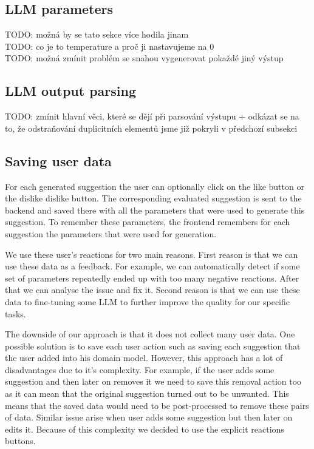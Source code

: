 \subsection{LLM parameters}

TODO: možná by se tato sekce více hodila jinam \\

TODO: co je to temperature a proč ji nastavujeme na 0 \\

TODO: možná zmínit problém se snahou vygenerovat pokaždé jiný výstup \\


\subsection{LLM output parsing}

TODO: zmínit hlavní věci, které se dějí při parsování výstupu + odkázat se na to, že odstraňování duplicitních elementů jsme již pokryli v předchozí subsekci \\


\subsection{Saving user data}

For each generated suggestion the user can optionally click on the like button or the dislike dislike button. The corresponding evaluated suggestion is sent to the backend and saved there with all the parameters that were used to generate this suggestion. To remember these parameters, the frontend remembers for each suggestion the parameters that were used for generation.

We use these user's reactions for two main reasons. First reason is that we can use these data as a feedback. For example, we can automatically detect if some set of parameters repeatedly ended up with too many negative reactions. After that we can analyse the issue and fix it. Second reason is that we can use these data to fine-tuning some LLM to further improve the quality for our specific tasks.

The downside of our approach is that it does not collect many user data. One possible solution is to save each user action such as saving each suggestion that the user added into his domain model. However, this approach has a lot of disadvantages due to it's complexity. For example, if the user adds some suggestion and then later on removes it we need to save this removal action too as it can mean that the original suggestion turned out to be unwanted. This means that the saved data would need to be post-processed to remove these pairs of data. Similar issue arise when user adds some suggestion but then later on edits it. Because of this complexity we decided to use the explicit reactions buttons.



